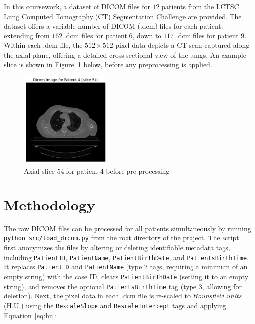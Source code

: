 \documentclass[12pt]{report}
\newcommand{\inlinecode}[1]{\lstinline[style=inline]{#1}}
\begin{document}
In this coursework, a dataset of DICOM files for $12$ patients from the LCTSC Lung Computed Tomography (CT) Segmentation Challenge are provided.\cite{noauthor_lctsc_nodate} The dataset offers a variable number of DICOM (.dcm) files for each patient: extending from $162$ .dcm files for patient $6$, down to $117$ .dcm files for patient $9$. Within each .dcm file, the $512 \times 512$ pixel data depicts a CT scan captured along the axial plane, offering a detailed cross-sectional view of the lungs. An example slice is shown in Figure~\ref{fig:slice_54} below, before any preprocessing is applied.

\begin{figure}[ht]
    \centering
    \includegraphics[width=0.4\textwidth]{slice54.png}
    \caption{Axial slice 54 for patient 4 before pre-processing}
    \label{fig:slice_54}
\end{figure}

\section{Methodology}
\label{sec:methodology}

The raw DICOM files can be processed for all patients simultaneously by running \inlinecode{python src/load_dicom.py} from the root directory of the project. The script first anonymizes the files by altering or deleting identifiable metadata tags, including \verb|PatientID|, \verb|PatientName|, \verb|PatientBirthDate|, and \verb|PatientsBirthTime|. It replaces \verb|PatientID| and \verb|PatientName| (type 2 tags, requiring a minimum of an empty string) with the case ID, clears \verb|PatientBirthDate| (setting it to an empty string), and removes the optional \verb|PatientsBirthTime| tag (type 3, allowing for deletion).
\newpage
Next, the pixel data in each .dcm file is re-scaled to \textit{Hounsfield units} (H.U.) using the \verb|RescaleSlope| and \verb|RescaleIntercept| tags and applying Equation~\ref{eq:hu}:
\end{document}
